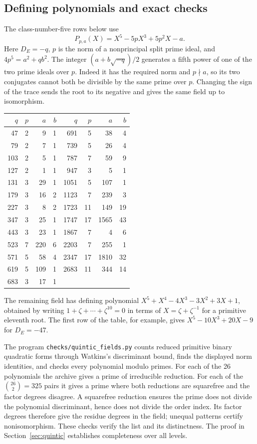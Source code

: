 \subsection*{Defining polynomials and exact checks}
The class-number-five rows below use
\[
             P_{p,a}(X)=X^5-5pX^3+5p^2X-a .
\]
Here $D_E=-q$, $p$ is the norm of a nonprincipal split prime ideal, and
$4p^5=a^2+qb^2$. The integer $(a+b\sqrt{-q})/2$ generates a fifth
power of one of the two prime ideals over $p$. Indeed it has the
required norm and $p\nmid a$, so its two conjugates cannot both be divisible by the
same prime over $p$. Changing the sign of the trace sends the root to its
negative and gives the same field up to isomorphism.
\begin{center}
\begin{tabular}{rrrr@{\hspace{2.5em}}rrrr}
\toprule
$q$ & $p$ & $a$ & $b$ & $q$ & $p$ & $a$ & $b$\\
\midrule
47 & 2 & 9 & 1 & 691 & 5 & 38 & 4 \\
79 & 2 & 7 & 1 & 739 & 5 & 26 & 4 \\
103 & 2 & 5 & 1 & 787 & 7 & 59 & 9 \\
127 & 2 & 1 & 1 & 947 & 3 & 5 & 1 \\
131 & 3 & 29 & 1 & 1051 & 5 & 107 & 1 \\
179 & 3 & 16 & 2 & 1123 & 7 & 239 & 3 \\
227 & 3 & 8 & 2 & 1723 & 11 & 149 & 19 \\
347 & 3 & 25 & 1 & 1747 & 17 & 1565 & 43 \\
443 & 3 & 23 & 1 & 1867 & 7 & 4 & 6 \\
523 & 7 & 220 & 6 & 2203 & 7 & 255 & 1 \\
571 & 5 & 58 & 4 & 2347 & 17 & 1810 & 32 \\
619 & 5 & 109 & 1 & 2683 & 11 & 344 & 14 \\
683 & 3 & 17 & 1 &  &  &  &  \\
\bottomrule
\end{tabular}
\end{center}
The remaining field has defining polynomial
$X^5+X^4-4X^3-3X^2+3X+1$, obtained by writing
$1+\zeta+\cdots+\zeta^{10}=0$ in terms of $X=\zeta+\zeta^{-1}$ for
a primitive eleventh root. The first row of the table, for example,
gives $X^5-10X^3+20X-9$ for $D_E=-47$.

The program \texttt{checks/quintic\_fields.py} counts reduced primitive
binary quadratic forms through Watkins's discriminant bound, finds the
displayed norm identities, and checks every polynomial modulo primes.
For each of the 26 polynomials the archive gives a prime of irreducible
reduction. For each of the $\binom{26}{2}=325$ pairs it gives a prime
where both reductions are squarefree and the factor degrees disagree.
A squarefree reduction ensures the prime does not divide the polynomial
discriminant, hence does not divide the order index. Its factor degrees
therefore give the residue degrees in the field; unequal patterns certify
nonisomorphism. These checks verify the list and its distinctness.
The proof in Section~\ref{sec:quintic} establishes completeness over all levels.
